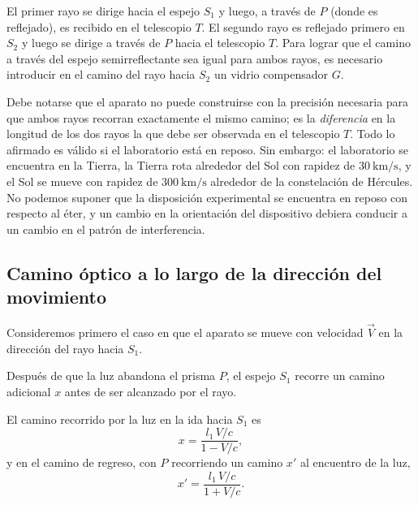 El primer rayo se dirige hacia el espejo $S_1$ y luego, a través de $P$
(donde es reflejado), es recibido en el telescopio $T$. El segundo rayo
es reflejado primero en $S_2$ y luego se dirige a través de $P$ hacia el
telescopio $T$. Para lograr que el camino a través del espejo
semirreflectante sea igual para ambos rayos, es necesario introducir en
el camino del rayo hacia $S_2$ un vidrio compensador $G$.

Debe notarse que el aparato no puede construirse con la precisión
necesaria para que ambos rayos recorran exactamente el mismo camino; es
la \emph{diferencia} en la longitud de los dos rayos la que debe ser
observada en el telescopio $T$. Todo lo afirmado es válido si el
laboratorio está en reposo. Sin embargo: el laboratorio se encuentra en
la Tierra, la Tierra rota alrededor del Sol con rapidez de $30\
\text{km/s}$, y el Sol se mueve con rapidez de $300\ \text{km/s}$
alrededor de la constelación de Hércules. No podemos suponer que la
disposición experimental se encuentra en reposo con respecto al éter, y
un cambio en la orientación del dispositivo debiera conducir a un cambio
en el patrón de interferencia.

\subsection{Camino óptico a lo largo de la dirección del movimiento}

Consideremos primero el caso en que el aparato se mueve con velocidad
$\vec V$ en la dirección del rayo hacia $S_1$.

\begin{center}
\end{center}

Después de que la luz abandona el prisma $P$, el espejo $S_1$ recorre un
camino adicional $x$ antes de ser alcanzado por el rayo.

\begin{proposicionc}
El camino recorrido por la luz en la ida hacia $S_1$ es
\[
x = \frac{l_1\,V/c}{1-V/c},
\]
y en el camino de regreso, con $P$ recorriendo un camino $x'$ al
encuentro de la luz,
\[
x' = \frac{l_1\,V/c}{1+V/c}.
\]
\end{proposicionc}

